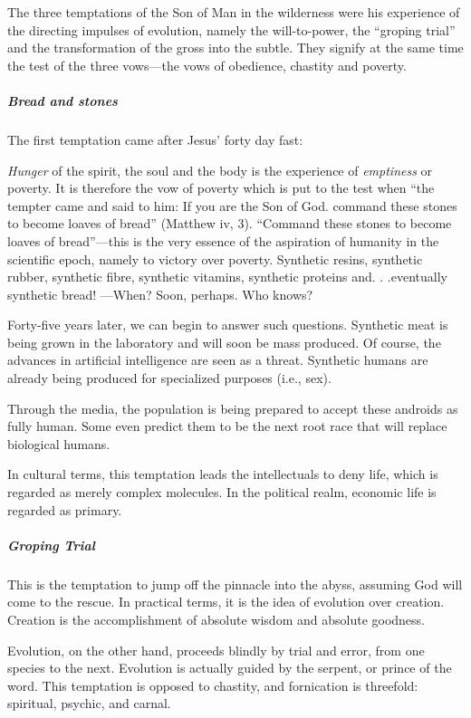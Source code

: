 The three temptations of the Son of Man in the wilderness were his experience of the directing impulses of evolution, namely the will-to-power, the “groping trial” and the transformation of the gross into the subtle. They signify at the same time the test of the three vows—the vows of obedience, chastity and poverty.

\subparagraph{Bread and stones}
The first temptation came after Jesus' forty day fast:

\begin{quotex}
\emph{Hunger} of the spirit, the soul and the body is the experience of \emph{emptiness} or poverty. It is therefore the vow of poverty which is put to the test when “the tempter came and said to him: If you are the Son of God. command these stones to become loaves of bread” (Matthew iv, 3). “Command these stones to become loaves of bread”—this is the very essence of the aspiration of humanity in the scientific epoch, namely to victory over poverty. Synthetic resins, synthetic rubber, synthetic fibre, synthetic vitamins, synthetic proteins and. . .eventually synthetic bread! —When? Soon, perhaps. Who knows? 

\end{quotex}
Forty-five years later, we can begin to answer such questions. Synthetic meat is being grown in the laboratory and will soon be mass produced. Of course, the advances in artificial intelligence are seen as a threat. Synthetic humans are already being produced for specialized purposes (i.e., sex).

Through the media, the population is being prepared to accept these androids as fully human. Some even predict them to be the next root race that will replace biological humans.

In cultural terms, this temptation leads the intellectuals to deny life, which is regarded as merely complex molecules. In the political realm, economic life is regarded as primary.

\subparagraph{Groping Trial}
This is the temptation to jump off the pinnacle into the abyss, assuming God will come to the rescue. In practical terms, it is the idea of evolution over creation. Creation is the accomplishment of absolute wisdom and absolute goodness.

Evolution, on the other hand, proceeds blindly by trial and error, from one species to the next. Evolution is actually guided by the serpent, or prince of the word. This temptation is opposed to chastity, and fornication is threefold: spiritual, psychic, and carnal.

